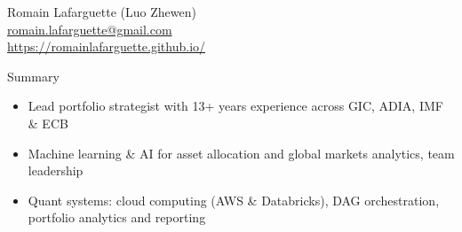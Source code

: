 \documentclass[usegeometry, 10pt, a4paper]{cv} %
\begin{document}
\hspace{10mm}
\begin{chapeau}
\begin{adresse}
\begin{flushleft}
    Romain Lafarguette (Luo Zhewen)\\
    \href{mailto:romain.lafarguette@gmail.com}{romain.lafarguette@gmail.com}\\
    \url{https://romainlafarguette.github.io/} \\
\end{flushleft}
\end{adresse}
\end{chapeau}

\vspace{-0.5cm}

\begin{rubriquetableau}[0.95\textwidth]{Summary}\\
  \vspace{-1cm}
  \begin{itemize}
  \item Lead portfolio strategist with 13+ years experience across GIC, ADIA, IMF \& ECB 
  \item Machine learning \& AI for asset allocation and global markets analytics, team leadership
  \item Quant systems: cloud computing (AWS \& Databricks), DAG orchestration, portfolio analytics and reporting  
  \end{itemize}

\end{rubriquetableau}

\vspace{0.2cm}

\end{document}
